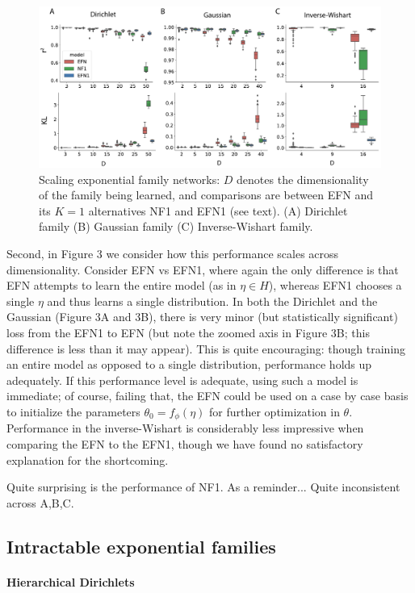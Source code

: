 \documentclass{article}
\begin{document}
 \begin{figure}
  \centering
\includegraphics[scale=0.46]{figs/fig3/fig3.pdf}
  \caption{Scaling exponential family networks: $D$ denotes the dimensionality of the family being learned, and comparisons are between EFN and its $K=1$ alternatives NF1 and EFN1 (see text).  (A) Dirichlet family (B) Gaussian family  (C) Inverse-Wishart family.}
\end{figure}

Second, in Figure 3 we consider how this performance scales across dimensionality.  Consider EFN vs EFN1, where again the only difference is that EFN attempts to learn the entire model (as in $\eta \in H$), whereas EFN1 chooses a single $\eta$ and thus learns a single distribution.  In both the Dirichlet and the Gaussian (Figure 3A and 3B), there is very minor (but statistically significant) loss from the EFN1 to EFN (but note the zoomed axis in Figure 3B; this difference is less than it may appear).  This is quite encouraging: though training an entire model as opposed to a single distribution, performance holds up adequately.  If this performance level is adequate, using such a model is immediate; of course, failing that, the EFN could be used on a case by case basis to initialize the parameters $\theta_0 = f_\phi(\eta)$ for further optimization in $\theta$.  Performance in the inverse-Wishart is considerably less impressive when comparing the EFN to the EFN1, though we have found no satisfactory explanation for the shortcoming.

Quite surprising is the performance of NF1.  As a reminder...  Quite inconsistent across A,B,C.

\subsection{Intractable exponential families}


\paragraph{Hierarchical Dirichlets}
\end{document}

